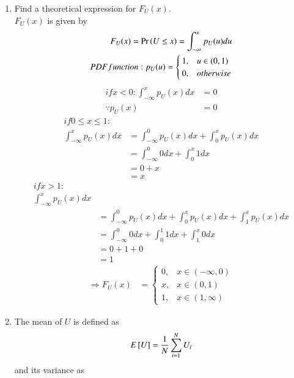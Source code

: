 \documentclass[journal,12pt,twocolumn]{IEEEtran}
\renewcommand\thesection{\arabic{section}}
\begin{document}
\begin{enumerate}[label=\thesection.\arabic*
,ref=\thesection.\theenumi]
\begin{figure}[!htbp]
\caption{The CDF of $U$}
\label{fig:uni_cdf}
\end{figure}
%
\item
Find a  theoretical expression for $F_{U}(x)$.\\
\solution 
$F_{U}(x)$ is given by
\begin{align}
F_{U}(x) = \Pr\left(U \le x\right) = \int_{-\infty}^{x} p_{U}(u)du \\
PDF function : p_{U}(u) =
    \begin{cases}
       1, & u \in (0,1) \\
       0, & otherwise
    \end{cases}  
\end{align}
\begin{align}
if x<0 : \int_{-\infty}^{x} p_U(x) dx & = 0\\ \because p_U(x) & = 0
\end{align}
\begin{align}
if 0\leq x \leq1 :\\ \int_{-\infty}^{x} p_U(x) dx & = \int_{-\infty}^{0} p_U(x) dx + \int_{0}^{x} p_U(x) dx\\& = \int_{-\infty}^{0} 0 dx + \int_{0}^{x} 1 dx\\& = 0+x\\& = x
\end{align}
\begin{align}
if x>1 :\\ \int_{-\infty}^{x} p_U(x) dx \\& = \int_{-\infty}^{0} p_U(x) dx + \int_{0}^{x} p_U(x) dx + \int_{1}^x p_U(x) dx\\ & = \int_{-\infty}^{0} 0 dx + \int_{0}^{1} 1 dx + \int_{1}^x 0 dx\\& = 0+1+0\\& = 1
\end{align}
\begin{align}
\Rightarrow F_{U}(x) & =   
   \begin{cases}
       0, & x \in (-\infty,0) \\
       x, & x \in (0,1) \\
       1, & x \in (1,\infty)
    \end{cases} 
\end{align}
\item
The mean of $U$ is defined as
%
\begin{equation}
E{}\left[U\right] = \frac{1}{N}\sum_{i=1}^{N}U_i
\end{equation}
%
and its variance as
%
\begin{equation}

\end{equation}
\end{enumerate}
\end{document}
